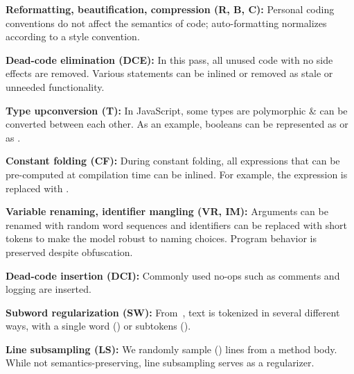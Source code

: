 \documentclass[11pt]{article}
\begin{document}
\textbf{Reformatting, beautification, compression (R, B, C):}
Personal coding conventions do not affect the semantics of code; auto-formatting normalizes according to a style convention.

\textbf{Dead-code elimination (DCE):}
In this pass, all unused code with no side effects are removed. Various statements can be inlined or removed as stale or unneeded functionality.

\textbf{Type upconversion (T):}
In JavaScript, some types are polymorphic \& can be converted between each other. As an example, booleans can be represented as  or as .

\textbf{Constant folding (CF):}
During constant folding, all expressions that can be pre-computed at compilation time can be inlined. For example, the expression  is replaced with .

\textbf{Variable renaming, identifier mangling (VR, IM):}
Arguments can be renamed with random word sequences and identifiers can be replaced with short tokens to make the model robust to naming choices. Program behavior is preserved despite obfuscation.

\textbf{Dead-code insertion (DCI):}
Commonly used no-ops such as comments and logging are inserted.

\textbf{Subword regularization (SW):}
From~\citet{kudo2018subword}, text is tokenized in several different ways, with a single word () or subtokens ().

\textbf{Line subsampling (LS):}
We randomly sample () lines from a method body. While not semantics-preserving, line subsampling serves as a regularizer.
\end{document}
